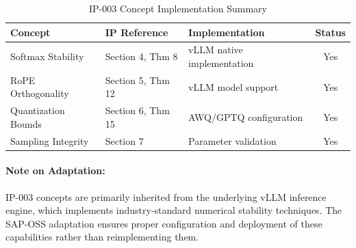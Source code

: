 \begin{table}[H]
\centering
\caption{IP-003 Concept Implementation Summary}
\begin{tabularx}{\textwidth}{@{}p{3cm}p{3.5cm}Xc@{}}
\toprule
\textbf{Concept} & \textbf{IP Reference} & \textbf{Implementation} & \textbf{Status} \\
\midrule
Softmax Stability & Section 4, Thm 8 & vLLM native implementation & Yes \\
RoPE Orthogonality & Section 5, Thm 12 & vLLM model support & Yes \\
Quantization Bounds & Section 6, Thm 15 & AWQ/GPTQ configuration & Yes \\
Sampling Integrity & Section 7 & Parameter validation & Yes \\
\bottomrule
\end{tabularx}
\end{table}

\paragraph{Note on Adaptation:}
IP-003 concepts are primarily inherited from the underlying vLLM inference engine, which implements industry-standard numerical stability techniques. The SAP-OSS adaptation ensures proper configuration and deployment of these capabilities rather than reimplementing them.